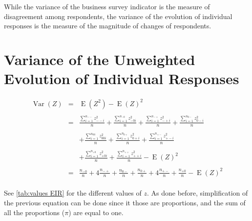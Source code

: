 \documentclass[12pt,a4paper,oneside]{book}
\DeclareMathOperator{\Var}{Var}
\DeclareMathOperator{\E}{E}
\begin{document}
While the variance of the business survey indicator is the measure of disagreement among respondents, the variance of the evolution of individual responses is the measure of the magnitude of changes of respondents.


\section{Variance of the Unweighted Evolution of Individual Responses}






\begin{eqnarray}
\Var(Z) &=&  
	\E \left( Z^2\right) - \E \left( Z\right)^2 \nonumber \\ \nonumber \\
	&=&  \frac{ \sum_{i=1}^{n_{--}} z^2_{--i}}{n} 
     +  \frac{\sum_{i=1}^{n_{-0}} z^2_{-0i} }{n} 
    +  \frac{\sum_{i=1}^{n_{-+}} z^2_{-+i}}{n} 
    +  \frac{\sum_{i=1}^{n_{0-}} z^2_{0-i} }{n} \nonumber  \\ \nonumber  \\
    && +  \frac{\sum_{i=1}^{n_{00}} z^2_{00i} }{n}  
      +  \frac{\sum_{i=1}^{n_{0+}} z^2_{0+i}}{n} 
    +  \frac{\sum_{i=1}^{n_{+-}} z^2_{+-i} }{n}  \nonumber \\ \nonumber  \\
    && +  \frac{\sum_{i=1}^{n_{+0}} z^2_{+0i} }{n} 
    +  \frac{\sum_{i=1}^{n_{++}} z^2_{++i}}{n}   
     - \E(Z)^2 \\  \nonumber  \\ 
     &=& \frac{n_{-0}}{n} 
    + 4  \frac{n_{-+}}{n} 
    +  \frac{n_{0-}}{n}  
    +        \frac{n_{0+}}{n} 
    + 4  \frac{n_{+-}}{n}   
    +  \frac{n_{+0}}{n}  
     - \E(Z)^2 \nonumber \\
\end{eqnarray}

See \autoref{tab:values EIR} for the different values of $z$. As done before, simplification of the previous equation can be done since it those are proportions, and the sum of all the proportions ($\pi$) are equal to one.
\end{document}

